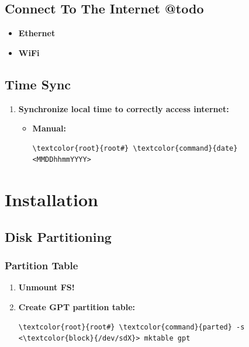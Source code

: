 \documentclass[10pt, a4paper, onecolumn, oneside, titlepage, openany]{book}
\begin{document}
\section{Connect To The Internet @todo}
\begin{itemize}
    \item \textbf{Ethernet}

    \item \textbf{WiFi}
\end{itemize}

\section{Time Sync}
\begin{enumerate}
    \item \textbf{Synchronize local time to correctly access internet:}
    \begin{itemize}
        \item \textbf{Manual:}
\begin{Verbatim}[commandchars=\\\{\}]
\textcolor{root}{root#} \textcolor{command}{date} <MMDDhhmmYYYY>
\end{Verbatim}
    \end{itemize}
\end{enumerate}


\chapter{Installation}
\section{Disk Partitioning}
\subsection{Partition Table}
\begin{enumerate}
    \item \textbf{Unmount FS!}
    \item \textbf{Create GPT partition table:}
\begin{Verbatim}[commandchars=\\\{\}]
\textcolor{root}{root#} \textcolor{command}{parted} -s <\textcolor{block}{/dev/sdX}> mktable gpt
\end{Verbatim}
\end{enumerate}
\end{document}
